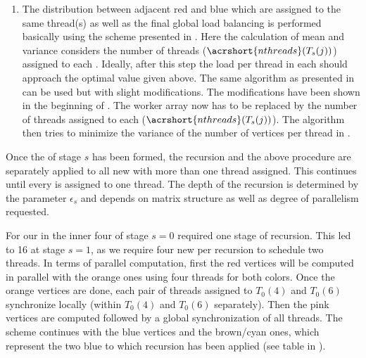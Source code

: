 \begin{enumerate}
	\item The distribution between adjacent red and blue \levelGroups which are assigned to the same thread(s) as well as the final global load balancing is performed basically using the scheme presented in . 
	Here the calculation of mean and variance considers the number of threads ($\acrshort{nthreads}(T_{s}(j))$) assigned to each \levelGroup . Ideally, after this step the load per thread in each \levelGroup should approach the optimal value given above.
	The same algorithm  as presented in  can be used but with slight modifications. The modifications have been shown in the beginning of . The worker array now has to be replaced by the number of threads assigned to each \levelGroup ($\acrshort{nthreads}(T_{s}(j))$). The algorithm then tries to minimize the variance of the number of vertices per thread in \levelGroups.
\end{enumerate}
Once the \levelGroup of stage $s$ has been formed, the recursion and the above procedure are separately applied to all new \levelGroups with more than one thread assigned. This continues until every \levelGroup is assigned to one thread. The depth of the recursion is determined by the parameter $\epsilon_s$ and depends on matrix structure as well as degree of parallelism requested. 

For our \stex in   the inner four \levelGroups of stage $s=0$ required one stage of recursion. This led to 16 \levelGroups at stage $s=1$, as we require four new \levelGroups per recursion to schedule two threads. 
In terms of parallel computation, first the red vertices will be computed in parallel with the orange ones using four threads for both colors. Once the orange vertices are done, each pair of threads assigned to $T_0(4)$ and $T_0(6)$ synchronize locally (\ie within $T_0(4)$ and $T_0(6)$ separately). Then the pink vertices are computed followed by a global synchronization of all threads. The scheme continues with the blue vertices and the brown/cyan ones, which represent the two blue \levelGroups to which recursion has been applied (see table in ).  

